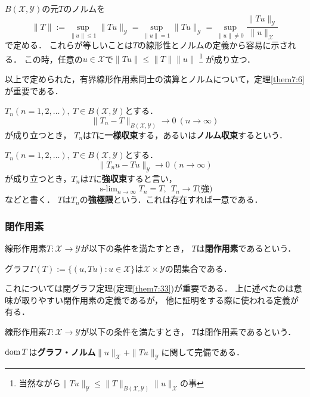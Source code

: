 \documentclass[a4j]{jsarticle}
\newcommand{\spX}{\mathscr{X}}
\newcommand{\spY}{\mathscr{Y}}
\newcommand{\spB}[2]{B(\mathscr{#1}, \mathscr{#2})}
\begin{document}
    \begin{Def}
        $\spB{X}{Y}$の元$T$のノルムを
        \[
            \|T\|
            :=\sup_{\|u\| \leq 1}{\|Tu\|_{\spY}}
            =\sup_{\|u\|=1}{\|Tu\|_{\spY}}
            =\sup_{\|u\| \neq 0}{ \frac{\|Tu\|_{\spY}}{\|u\|_{\spX}} }
        \]
        で定める．
        これらが等しいことは$T$の線形性とノルムの定義から容易に示される．
        この時，任意の$u \in \spX$で$\|Tu\| \leq \|T\| \|u\|$
        \footnote{当然ながら$\|Tu\|_{\spY} \leq \|T\|_{\spB{X}{Y}} \|u\|_{\spX} $の事}
        が成り立つ．
    \end{Def}
    以上で定められた，有界線形作用素同士の演算とノルムについて，定理\ref{them7:6}が重要である．

    \begin{Def}
        $T_n (n=1,2,\dots),~ T \in \spB{X}{Y}$とする．
        \[ \|T_n-T\|_{\spB{X}{Y}} \to 0 ~(n \to \infty) \]
        が成り立つとき，
        $T_n$は$T$に\textbf{一様収束}する，あるいは\textbf{ノルム収束}するという．
    \end{Def}
    \begin{Def}
        $T_n (n=1,2,\dots),~ T \in \spB{X}{Y}$とする．
        \[ \|T_n u-T u\|_{\spY} \to 0 ~(n \to \infty) \]
        が成り立つとき，$T_n$は$T$に\textbf{強収束}すると言い，
        \[ \operatorname{s-lim}_{n \to \infty}{T_n}=T,~~ T_n \to T \mbox{(強)} \]
        などと書く．
        $T$は$T_n$の\textbf{強極限}という．これは存在すれば一意である．
    \end{Def}

    \subsubsection{閉作用素}
    \begin{Def}[閉作用素/1]
        線形作用素$T: \spX \to \spY$が以下の条件を満たすとき，
        $T$は\textbf{閉作用素}であるという．
        \begin{center}
            グラフ$\Gamma(T):=\{ (u, Tu) : u \in \spX \}$は$\spX \times \spY$の閉集合である．
        \end{center}
    \end{Def}
    これについては閉グラフ定理(定理\ref{them7:33})が重要である．
    上に述べたのは意味が取りやすい閉作用素の定義であるが，
    他に証明をする際に使われる定義が有る．
    \begin{Def}[閉作用素/2]
        線形作用素$T: \spX \to \spY$が以下の条件を満たすとき，
        $T$は閉作用素であるという．
        \begin{center}
            $\operatorname{dom} T$は\textbf{グラフ・ノルム}$\|u\|_{\spX}+\|Tu\|_\spY$に関して完備である．
        \end{center}
    \end{Def}
\end{document}

